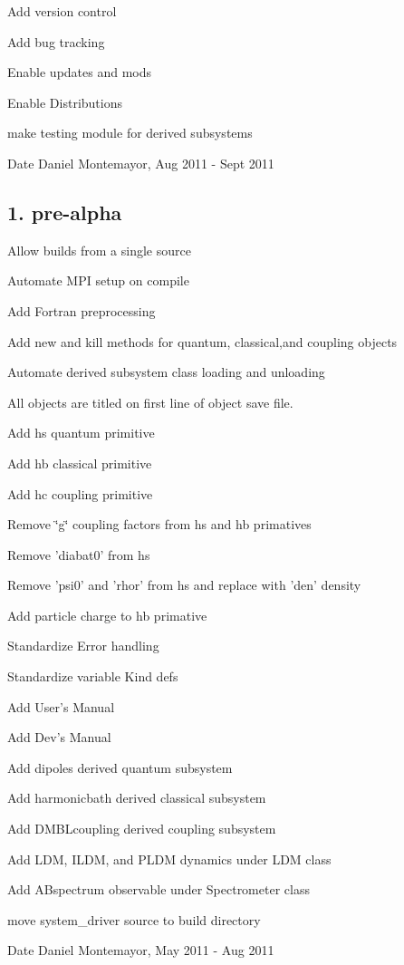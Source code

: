 \begin{DoxyItemize}
\item Add version control
\item Add bug tracking
\item Enable updates and mods
\item Enable Distributions
\item make testing module for derived subsystems \begin{DoxyDate}{Date}
Daniel Montemayor, Aug 2011 -\/ Sept 2011
\end{DoxyDate}

\end{DoxyItemize}\hypertarget{_tags_v1_0pa}{}\subsection{1. pre-\/alpha}\label{_tags_v1_0pa}

\begin{DoxyItemize}
\item Allow builds from a single source
\item Automate M\-P\-I setup on compile
\item Add Fortran preprocessing
\item Add new and kill methods for quantum, classical,and coupling objects
\item Automate derived subsystem class loading and unloading
\item All objects are titled on first line of object save file.
\item Add hs quantum primitive
\item Add hb classical primitive
\item Add hc coupling primitive
\item Remove \char`\"{}g\char`\"{} coupling factors from hs and hb primatives
\item Remove 'diabat0' from hs
\item Remove 'psi0' and 'rhor' from hs and replace with 'den' density
\item Add particle charge to hb primative
\item Standardize Error handling
\item Standardize variable Kind defs
\item Add User's Manual
\item Add Dev's Manual
\item Add dipoles derived quantum subsystem
\item Add harmonicbath derived classical subsystem
\item Add D\-M\-B\-Lcoupling derived coupling subsystem
\item Add L\-D\-M, I\-L\-D\-M, and P\-L\-D\-M dynamics under L\-D\-M class
\item Add A\-Bspectrum observable under Spectrometer class
\item move system\-\_\-driver source to build directory
\end{DoxyItemize}

 \begin{DoxyDate}{Date}
Daniel Montemayor, May 2011 -\/ Aug 2011
\end{DoxyDate}
  